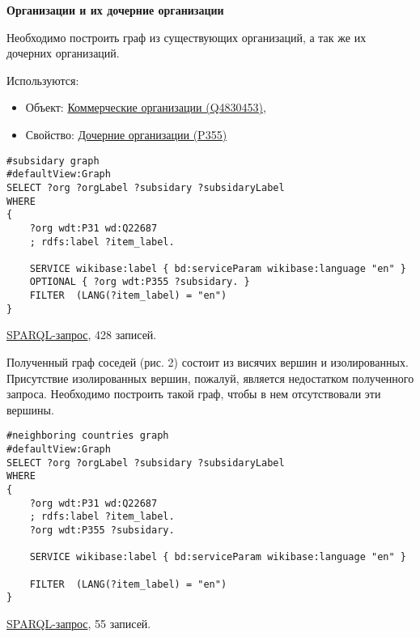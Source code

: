 \textbf{Организации и их дочерние организации}

Необходимо построить граф из существующих организаций, а так же их дочерних организаций.

Используются:
\begin{itemize}
    \item Объект: \href{https://www.wikidata.org/wiki/Q4830453}{Коммерческие организации (Q4830453)},
    \item Свойство: \href{https://www.wikidata.org/wiki/Property:P355}{Дочерние организации (P355)}
\end{itemize}

\begin{lstlisting}[language=SPARQL]
#subsidary graph
#defaultView:Graph
SELECT ?org ?orgLabel ?subsidary ?subsidaryLabel
WHERE
{
    ?org wdt:P31 wd:Q22687
    ; rdfs:label ?item_label.

    SERVICE wikibase:label { bd:serviceParam wikibase:language "en" }
    OPTIONAL { ?org wdt:P355 ?subsidary. }
    FILTER  (LANG(?item_label) = "en") 
}
\end{lstlisting}

\href{https://query.wikidata.org/#%23neighboring%20countries%20graph%0A%23defaultView%3AGraph%0ASELECT%20%3Forg%20%3ForgLabel%20%3Fsubsidary%20%3FsubsidaryLabel%0AWHERE%0A%7B%0A%20%20%20%20%3Forg%20wdt%3AP31%20wd%3AQ22687%0A%20%20%20%20%3B%20rdfs%3Alabel%20%3Fitem_label%20.%0A%0A%20%20%20%20SERVICE%20wikibase%3Alabel%20%7B%20bd%3AserviceParam%20wikibase%3Alanguage%20%22en%22%20%7D%0A%20%20%20%20OPTIONAL%20%7B%20%3Forg%20wdt%3AP355%20%3Fsubsidary%20.%20%7D%0A%20%20%20%20FILTER%20%20%28LANG%28%3Fitem_label%29%20%3D%20%22en%22%29%20%0A%7D%0A}{SPARQL-запрос}, 428 записей.

Полученный граф соседей (рис. 2) состоит из висячих вершин и изолированных. Присутствие изолированных вершин, пожалуй, является недостатком полученного запроса. Необходимо построить такой граф, чтобы в нем отсутствовали эти вершины.

\begin{lstlisting}[language=SPARQL]
#neighboring countries graph
#defaultView:Graph
SELECT ?org ?orgLabel ?subsidary ?subsidaryLabel
WHERE
{
    ?org wdt:P31 wd:Q22687
    ; rdfs:label ?item_label.
    ?org wdt:P355 ?subsidary. 
  
    SERVICE wikibase:label { bd:serviceParam wikibase:language "en" }

    FILTER  (LANG(?item_label) = "en") 
}
\end{lstlisting}

\href{https://query.wikidata.org/#%23neighboring%20countries%20graph%0A%23defaultView%3AGraph%0ASELECT%20%3Forg%20%3ForgLabel%20%3Fsubsidary%20%3FsubsidaryLabel%0AWHERE%0A%7B%0A%20%20%20%20%3Forg%20wdt%3AP31%20wd%3AQ22687%0A%20%20%20%20%3B%20rdfs%3Alabel%20%3Fitem_label%20.%0A%20%20%20%20%3Forg%20wdt%3AP355%20%3Fsubsidary%20.%20%0A%20%20%0A%20%20%20%20SERVICE%20wikibase%3Alabel%20%7B%20bd%3AserviceParam%20wikibase%3Alanguage%20%22en%22%20%7D%0A%0A%20%20%20%20FILTER%20%20%28LANG%28%3Fitem_label%29%20%3D%20%22en%22%29%20%0A%7D%0A}{SPARQL-запрос}, 55 записей.
